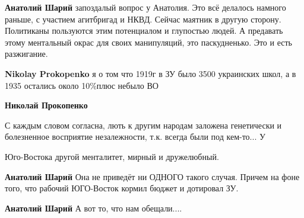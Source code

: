\begin{itemize}
\begin{itemize}
 
\textbf{Анатолий Шарий} запоздалый вопрос у Анатолия. Это всё делалось намного
раньше, с участием агитбригад и НКВД. Сейчас маятник в другую сторону.
Политиканы пользуются этим потенциалом и глупостью людей. А предавать этому
ментальный окрас для своих манипуляций, это паскудненько. Это и есть
разжигание.

 
\textbf{Nikolay Prokopenko} я о том что 1919г в ЗУ было 3500 украинских школ, а в 1935 остались около 10\%плюс небыло ВО

 
\textbf{Николай Прокопенко}

С каждым словом согласна, лють к другим народам заложена генетически и
болезненное восприятие незалежности, т.к. всегда были под кем-то... У

Юго-Востока другой менталитет, мирный и дружелюбный.

 
\textbf{Анатолий Шарий} Она не приведёт ни ОДНОГО такого случая. Причем на фоне того, что рабочий ЮГО-Восток кормил бюджет и дотировал ЗУ.

 
\textbf{Анатолий Шарий}
А вот то, что нам обещали....


\end{itemize}
\end{itemize}
